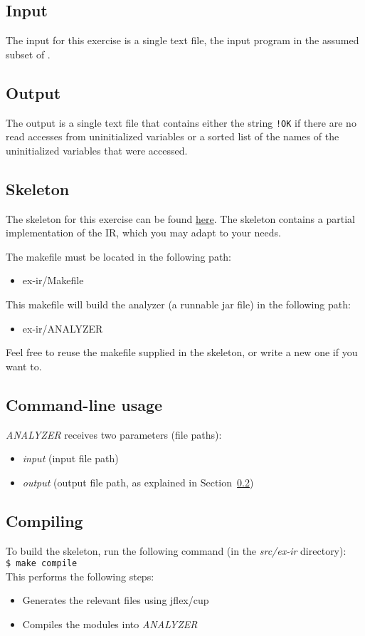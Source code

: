\documentclass{article}
\begin{document}
\subsection{Input}
The input for this exercise is a single text file, the input program in the assumed subset of  \plname.

\subsection{Output}
\label{sec:output}
The output is a single text file that contains either the string \texttt{!OK}
if there are no read accesses from uninitialized variables or a sorted list of the names of the uninitialized variables that were accessed.

\subsection{Skeleton}
The skeleton for this exercise can be found \href{https://github.com/davidtr1037/compilation-tau/tree/master/src/ex-ir}{here}.
The skeleton contains a partial implementation of the IR, which you may adapt to your needs.

The makefile must be located in the following path:
\begin{itemize}
    \item ex-ir/Makefile
\end{itemize}
This makefile will build the analyzer (a runnable jar file) in the following path:
\begin{itemize}
    \item ex-ir/ANALYZER
\end{itemize}
Feel free to reuse the makefile supplied in the skeleton,
or write a new one if you want to.

\subsection{Command-line usage}
\textit{ANALYZER} receives two parameters (file paths):
\begin{itemize}
    \item \textit{input} (input file path)
    \item \textit{output} (output file path, as explained in Section~\ref{sec:output})
\end{itemize}

\subsection{Compiling}
To build the skeleton, run the following command (in the \textit{src/ex-ir} directory): \\
\texttt{\$ make compile} \\
This performs the following steps:
\begin{itemize}
    \item Generates the relevant files using jflex/cup
    \item Compiles the modules into \textit{ANALYZER}
\end{itemize}
\end{document}
